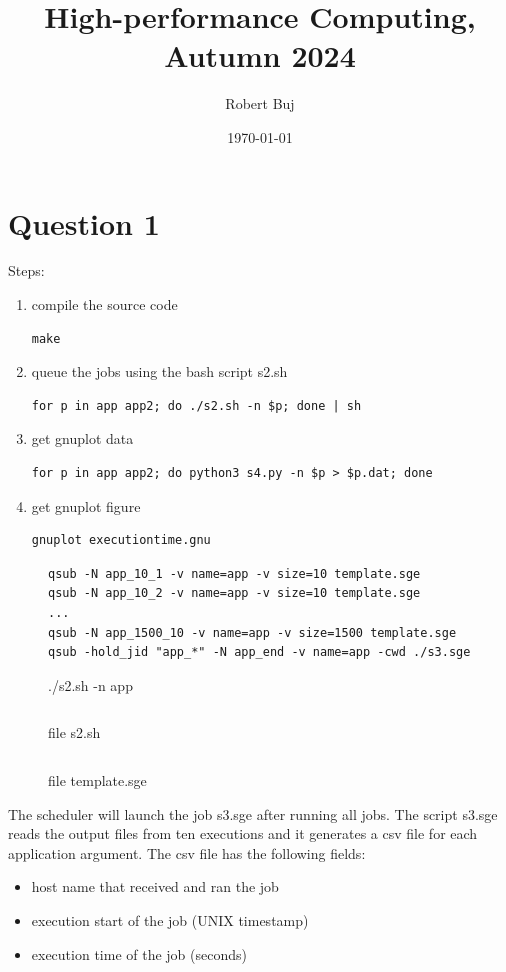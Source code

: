 \documentclass[12pt]{article}
\title{High-performance Computing, Autumn 2024}
\author{Robert Buj}
\date{\today}
\begin{document}
\maketitle

\section*{Question 1}

Steps:
\begin{enumerate}
	\item compile the source code
\begin{verbatim}
make
\end{verbatim}
	\item queue the jobs using the bash script s2.sh
\begin{verbatim}
for p in app app2; do ./s2.sh -n $p; done | sh
\end{verbatim}
	\item get gnuplot data
\begin{verbatim}
for p in app app2; do python3 s4.py -n $p > $p.dat; done
\end{verbatim}
	\item get gnuplot figure
\begin{verbatim}
gnuplot executiontime.gnu
\end{verbatim}
\end{enumerate}

\begin{figure}[h!]
	\begin{verbatim}
qsub -N app_10_1 -v name=app -v size=10 template.sge
qsub -N app_10_2 -v name=app -v size=10 template.sge
...
qsub -N app_1500_10 -v name=app -v size=1500 template.sge
qsub -hold_jid "app_*" -N app_end -v name=app -cwd ./s3.sge
	\end{verbatim}
	\caption{./s2.sh -n app}\label{code:helper}
\end{figure}


\newpage

\begin{figure}[h!]
	\inputminted{shell}{s2.sh}
	\caption{file s2.sh}\label{code:s2queue}
\end{figure}

\begin{figure}[h!]
	\inputminted{shell}{template.sge}
	\caption{file template.sge}\label{code:template}
\end{figure}

The scheduler will launch the job s3.sge after running all jobs. The script s3.sge reads the output files from ten executions and it generates a csv file for each application argument. The csv file has the following fields:
\begin{itemize}
	\item host name that received and ran the job
	\item execution start of the job (UNIX timestamp)
	\item execution time of the job (seconds)
\end{itemize}
\end{document}

